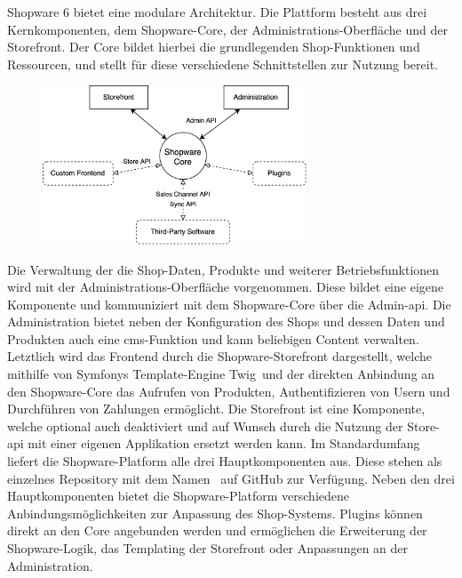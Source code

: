Shopware 6 bietet eine modulare Architektur.
Die Plattform besteht aus drei Kernkomponenten, dem Shopware-Core, der Administrations-Oberfläche und der Storefront.
Der Core bildet hierbei die grundlegenden Shop-Funktionen und Ressourcen, und stellt für diese verschiedene
Schnittstellen zur Nutzung bereit.
\begin{figure}[H]
    \centering
    \includegraphics[width=0.7\textwidth]{images/content/shopware-architecture}
    \label{fig:shopware-architecture}
\end{figure}
Die Verwaltung der die Shop-Daten, Produkte und weiterer Betriebsfunktionen wird mit der Administrations-Oberfläche
vorgenommen.
Diese bildet eine eigene Komponente und kommuniziert mit dem Shopware-Core über die Admin-\acrshort{api}.
Die Administration bietet neben der Konfiguration des Shops und dessen Daten und Produkten auch eine
\acrshort{cms}-Funktion und kann beliebigen Content verwalten.
Letztlich wird das Frontend durch die Shopware-Storefront dargestellt, welche mithilfe von Symfonys Template-Engine
\glqq Twig\grqq\ und der direkten Anbindung an den Shopware-Core das Aufrufen von Produkten, Authentifizieren von Usern
und Durchführen von Zahlungen ermöglicht.
Die Storefront ist eine Komponente, welche optional auch deaktiviert und auf Wunsch durch die
Nutzung der Store-\acrshort{api} mit einer eigenen Applikation ersetzt werden kann.
Im Standardumfang liefert die Shopware-Platform alle drei Hauptkomponenten aus.
Diese stehen als einzelnes Repository mit dem Namen\  auf GitHub zur Verfügung.
Neben den drei Hauptkomponenten bietet die Shopware-Platform verschiedene Anbindungsmöglichkeiten zur Anpassung des
Shop-Systems.
Plugins können direkt an den Core angebunden werden und ermöglichen die Erweiterung der Shopware-Logik, das Templating
der Storefront oder Anpassungen an der Administration.
